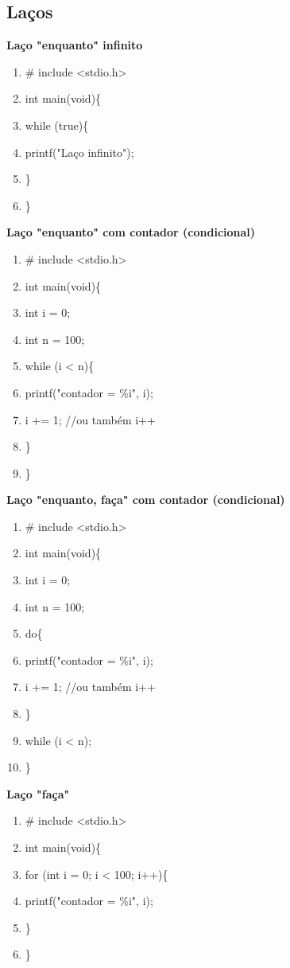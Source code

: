 \documentclass[12pt,a4paper]{article} %
\begin{document}
\subsection{Laços}
\textbf{Laço "enquanto" infinito}
\begin{enumerate}
\item \# include <stdio.h>
\item int main(void)\{
\item \tabto{1.1cm}while (true)\{
\item \tabto{2.2cm}printf("Laço infinito");
\item \tabto{1.1cm}\}
\item \}
\end{enumerate}
\textbf{Laço "enquanto" com contador (condicional)}
\begin{enumerate}
\item \# include <stdio.h>
\item int main(void)\{
\item \tabto{1.1cm}int i = 0;
\item \tabto{1.1cm}int n = 100;
\item \tabto{1.1cm}while (i < n)\{
\item \tabto{2.2cm}printf("contador = \%i", i);
\item \tabto{2.2cm}i += 1; //ou também i++
\item \tabto{1.1cm}\}
\item \}
\end{enumerate}
\textbf{Laço "enquanto, faça" com contador (condicional)}
\begin{enumerate}
\item \# include <stdio.h>
\item int main(void)\{
\item \tabto{1.1cm}int i = 0;
\item \tabto{1.1cm}int n = 100;
\item \tabto{1.1cm}do\{
\item \tabto{2.2cm}printf("contador = \%i", i);
\item \tabto{2.2cm}i += 1; //ou também i++
\item \tabto{1.1cm}\}
\item \tabto{1.1cm}while (i < n);
\item \}
\end{enumerate}
\textbf{Laço "faça"}
\begin{enumerate}
\item \# include <stdio.h>
\item int main(void)\{
\item \tabto{1.1cm}for (int i = 0; i < 100; i++)\{
\item \tabto{2.2cm}printf("contador = \%i", i);
\item \tabto{1.1cm}\}
\item \}
\end{enumerate}
\end{document}
